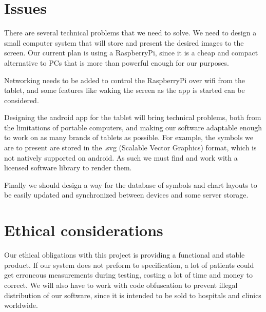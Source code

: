 \documentclass[12pt,a4paper,notitlepage]{report}
\begin{document}




\section{Issues}

There are several technical problems that we need to solve. We need to design a small computer system that will store and present the desired images to the screen. Our current plan is using a RaspberryPi, since it is a cheap and compact alternative to PCs that is more than powerful enough for our purposes. 

Networking needs to be added to control the RaspberryPi over wifi from the tablet, and some features like waking the screen as the app is started can be considered.

Designing the android app for the tablet will bring technical problems, both from the limitations of portable computers, and making our software adaptable enough to work on as many brands of tablets as possible. For example, the symbols we are to present are stored in the .svg (Scalable Vector Graphics) format, which is not natively supported on android. As such we must find and work with a licensed software library to render them. 

Finally we should design a way for the database of symbols and chart layouts to be easily updated and synchronized between devices and some server storage. 

\section{Ethical considerations}

Our ethical obligations with this project is providing a functional and stable product. If our system does not preform to specification, a lot of patients could get erroneous measurements during testing, costing a lot of time and money to correct. We will also have to work with code obfuscation to prevent illegal distribution of our software, since it is intended to be sold to hospitals and clinics worldwide.
\end{document}
